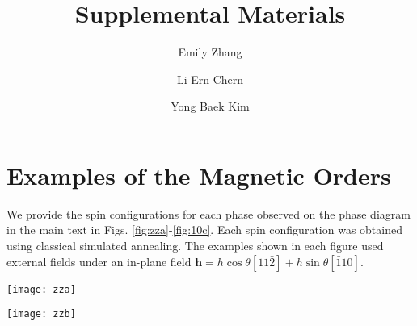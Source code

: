 \documentclass[reprint,amsmath,amssymb,aps,prb,superscriptaddress,longbibliography]{revtex4-1}
\renewcommand\[{\begin{equation}}
\renewcommand\]{\end{equation}}
\begin{document}
\title{Supplemental Materials}

\author{Emily Zhang}

\author{Li Ern Chern}

\author{Yong Baek Kim}

\maketitle

\setcounter{equation}{0}
\setcounter{figure}{0}
\setcounter{table}{0}

\renewcommand{\thesection}{S\arabic{section}}
\renewcommand{\theequation}{S\arabic{equation}}
\renewcommand{\thefigure}{S\arabic{figure}}
\renewcommand{\thetable}{S\arabic{table}}


\onecolumngrid

\section{Examples of the Magnetic Orders}

We provide the spin configurations for each phase observed on the phase diagram in the main text in Figs. \ref{fig:zza}-\ref{fig:10c}. Each spin configuration was obtained using classical simulated annealing. The examples shown in each figure used external fields under an in-plane field $\mathbf{h}=h\cos\theta\left[11\bar{2}\right]+h\sin\theta\left[\bar{1}10\right]$. 

\begin{figure*}
\begin{centering}
\texttt{[image: zza]}
\par\end{centering}
\caption{(a) The sublattice structure for the ZZa unit cell with the lattice
vectors shown in black. (b) The spin configuration of the ZZa order
shown on the honeycomb lattice. The parameters used were $K=-1,$
$\Gamma=0.5$, $\Gamma'=-0.02$, $h/S|K|=0.15$, and $\theta=150^{\circ}$.
\label{fig:zza}}

\end{figure*}

\begin{figure*}
\begin{centering}
\texttt{[image: zzb]}
\par\end{centering}
\caption{(a) The sublattice structure for the ZZb unit cell with the lattice
vectors shown in black. (b) The spin configuration of the ZZb order
shown on the honeycomb lattice. The parameters used were $K=-1,$
$\Gamma=0.5$, $\Gamma'=-0.02$, $h/S|K|=0.15$, and $\theta=30^{\circ}$.
\label{fig:zzb}}
\end{figure*}
\end{document}
